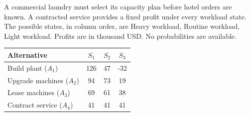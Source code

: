 \clearpage
{}
A commercial laundry must select its capacity plan before hotel orders are known. A contracted service provides a fixed profit under every workload state. The possible states, in column order, are Heavy workload, Routine workload, Light workload. Profits are in thousand USD. No probabilities are available.
\begin{center}
\begin{tabular}{@{}lccc@{}}\toprule
Alternative & $S_1$ & $S_2$ & $S_3$\\\midrule
Build plant ($A_1$) & 126 & 47 & -32\\
Upgrade machines ($A_2$) & 94 & 73 & 19\\
Lease machines ($A_3$) & 69 & 61 & 38\\
Contract service ($A_4$) & 41 & 41 & 41\\
\bottomrule\end{tabular}
\end{center}
